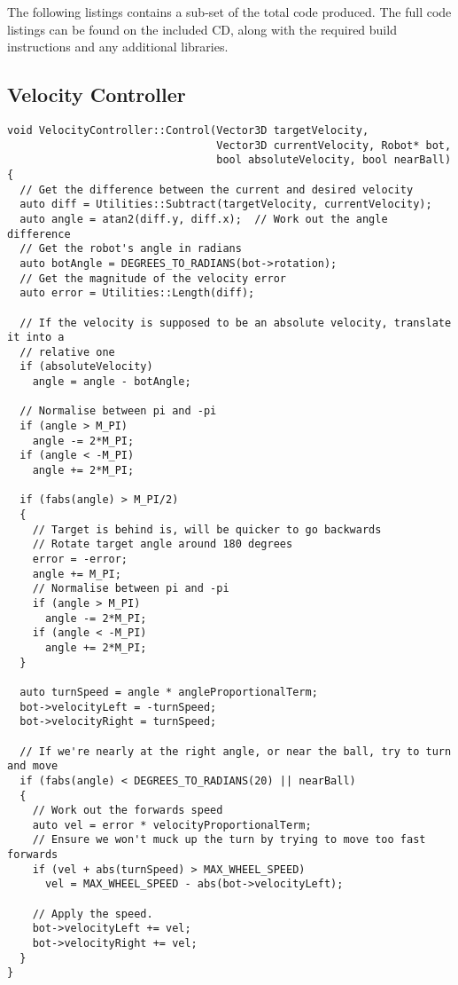 The following listings contains a sub-set of the total code produced.  The full
code listings can be found on the included CD, along with the required build
instructions and any additional libraries.

\lstset{language=C++}

\subsection{Velocity Controller\label{app:velControl}}

\begin{lstlisting}
void VelocityController::Control(Vector3D targetVelocity, 
                                 Vector3D currentVelocity, Robot* bot, 
                                 bool absoluteVelocity, bool nearBall)
{
  // Get the difference between the current and desired velocity
  auto diff = Utilities::Subtract(targetVelocity, currentVelocity); 
  auto angle = atan2(diff.y, diff.x);  // Work out the angle difference
  // Get the robot's angle in radians
  auto botAngle = DEGREES_TO_RADIANS(bot->rotation);
  // Get the magnitude of the velocity error 
  auto error = Utilities::Length(diff); 

  // If the velocity is supposed to be an absolute velocity, translate it into a
  // relative one
  if (absoluteVelocity) 
    angle = angle - botAngle;

  // Normalise between pi and -pi
  if (angle > M_PI)
    angle -= 2*M_PI;
  if (angle < -M_PI)
    angle += 2*M_PI;

  if (fabs(angle) > M_PI/2) 
  {
    // Target is behind is, will be quicker to go backwards
    // Rotate target angle around 180 degrees
    error = -error;
    angle += M_PI;
    // Normalise between pi and -pi
    if (angle > M_PI)
      angle -= 2*M_PI;
    if (angle < -M_PI)
      angle += 2*M_PI;
  }

  auto turnSpeed = angle * angleProportionalTerm;
  bot->velocityLeft = -turnSpeed;
  bot->velocityRight = turnSpeed;

  // If we're nearly at the right angle, or near the ball, try to turn and move
  if (fabs(angle) < DEGREES_TO_RADIANS(20) || nearBall) 
  {
    // Work out the forwards speed
    auto vel = error * velocityProportionalTerm;
    // Ensure we won't muck up the turn by trying to move too fast forwards
    if (vel + abs(turnSpeed) > MAX_WHEEL_SPEED)
      vel = MAX_WHEEL_SPEED - abs(bot->velocityLeft);

    // Apply the speed.
    bot->velocityLeft += vel;
    bot->velocityRight += vel;
  }
}
\end{lstlisting}

